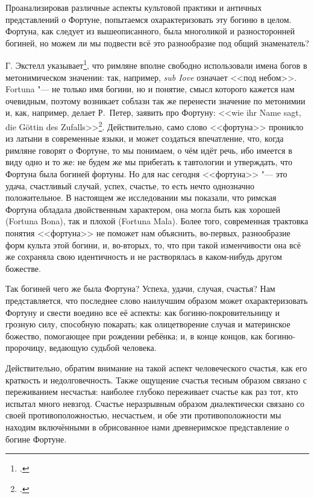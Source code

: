 Проанализировав различные аспекты культовой практики и античных представлений о Фортуне, попытаемся охарактеризовать эту богиню в целом. Фортуна, как следует из вышеописанного, была многоликой и разносторонней богиней, но можем ли мы подвести всё это разнообразие под общий знаменатель?

Г. Экстелл указывает\footcite[P. 86]{Axtell1907}, что римляне вполне свободно использовали имена богов в метонимическом значении: так, например, \textit{sub Iove} означает <<под небом>>. Fortuna "--- не только имя богини, но и понятие, смысл которого кажется нам очевидным, поэтому возникает соблазн так же перенести значение по метонимии и, как, например, делает Р.~Петер, заявить про Фортуну: <<wie ihr Name sagt, die G\"{o}ttin des Zufalls>>\footcite[Sp. 1503]{Peter1890Fortuna}. Действительно, само слово <<фортуна>> проникло из латыни в современные языки, и может создаться впечатление, что, когда римляне говорят о Фортуне, то мы понимаем, о чём идёт речь, ибо имеется в виду одно и то же: не будем же мы прибегать к тавтологии и утверждать, что Фортуна была богиней фортуны. Но для нас сегодня <<фортуна>> "--- это удача, счастливый случай, успех, счастье, то есть нечто однозначно положительное. В настоящем же исследовании мы показали, что римская Фортуна обладала двойственным характером, она могла быть как хорошей (Fortuna Bona), так и плохой (Fortuna Mala). Более того, современная трактовка понятия <<фортуна>> не поможет нам объяснить, во-первых, разнообразие форм культа этой богини, и, во-вторых, то, что при такой изменчивости она всё же сохраняла свою идентичность и не растворялась в каком-нибудь другом божестве.

Так богиней чего же была Фортуна? Успеха, удачи, случая, счастья? Нам представляется, что последнее слово наилучшим образом может охарактеризовать Фортуну и свести воедино все её аспекты: как богиню-покровительницу и грозную силу, способную покарать; как олицетворение случая и материнское божество, помогающее при рождении ребёнка; и, в конце концов, как богиню-пророчицу, ведающую судьбой человека.

Действительно, обратим внимание на такой аспект человеческого счастья, как его краткость и недолговечность. Также ощущение счастья тесным образом связано с переживанием несчастья: наиболее глубоко переживает счастье как раз тот, кто испытал много невзгод. Счастье неразрывным образом диалектически связано со своей противоположностью, несчастьем, и обе эти противоположности мы находим включёнными в обрисованное нами древнеримское представление о богине Фортуне.

